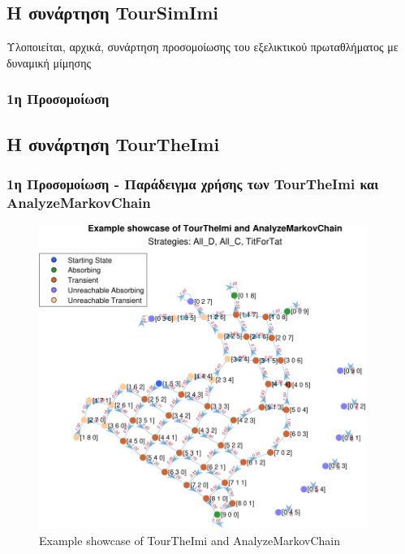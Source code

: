 \documentclass[12pt]{article}
\begin{document}
\subsection{Η συνάρτηση TourSimImi}
Υλοποιείται, αρχικά, συνάρτηση προσομοίωσης του εξελικτικού πρωταθλήματος με δυναμική μίμησης 
\subsubsection{1η Προσομοίωση}

\subsection{Η συνάρτηση TourTheImi}

\subsubsection{1η Προσομοίωση - Παράδειγμα χρήσης των TourTheImi και Analyze\-Markov\-Chain}
	\begin{figure}[H]
	      \centering
	      \includegraphics[width=0.95\textwidth]{Example showcase of TourTheImi and AnalyzeMarkovChain.pdf}
	      \caption{Example showcase of TourTheImi and AnalyzeMarkovChain}
	\end{figure}
\end{document}
